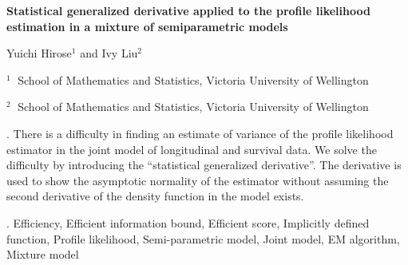 \documentclass[12pt]{article}
\begin{document}
\begin{flushleft}


{\LARGE\bf Statistical generalized  derivative applied to the profile likelihood estimation in a mixture of semiparametric models}


\vspace{1.0cm}

Yuichi Hirose$^1$ and Ivy Liu$^2$

\begin{description}

\item $^1 \;$ School of Mathematics and Statistics,
Victoria University of Wellington

\item $^2 \;$ School of Mathematics and Statistics,
Victoria University of Wellington

\end{description}

\end{flushleft}


\vspace{0.75cm}

. There is a difficulty in finding an estimate of variance of the profile likelihood estimator in the joint model of longitudinal and survival data. 
We solve the difficulty by introducing the ``statistical generalized  derivative''.
The derivative is used to show the asymptotic normality of the estimator without assuming the second derivative of the density function in the model exists.


\vskip 2mm

.
Efficiency,
Efficient information bound,
Efficient score,
Implicitly defined function,
Profile likelihood,
Semi-parametric model,
Joint model,
EM algorithm,
Mixture model
\end{document}
